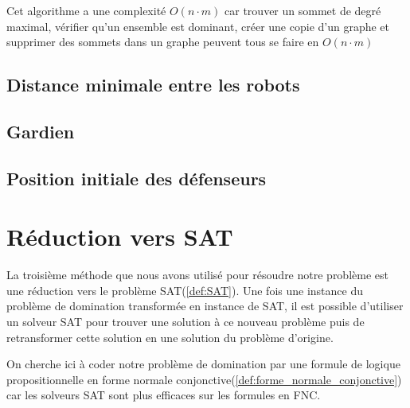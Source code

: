 \vspace{2\baselineskip}

Cet algorithme a une complexité $O(n\cdot m)$ car trouver un sommet de degré maximal, vérifier qu'un ensemble est dominant, créer une copie d'un graphe et supprimer des sommets dans un graphe peuvent tous se faire en $O(n\cdot m)$

\subsection{Distance minimale entre les robots}

\subsection{Gardien}

\subsection{Position initiale des défenseurs}

\section{Réduction vers SAT}

La troisième méthode que nous avons utilisé pour résoudre notre problème est une réduction vers le problème SAT(\ref{def:SAT}). Une fois une instance du problème de domination transformée en instance de SAT, il est possible d'utiliser un solveur SAT pour trouver une solution à ce nouveau problème puis de retransformer cette solution en une solution du problème d'origine.\newline 

On cherche ici à coder notre problème de domination par une formule de logique propositionnelle en forme normale conjonctive(\ref{def:forme_normale_conjonctive}) car les solveurs SAT sont plus efficaces sur les formules en FNC.

\vspace{2\baselineskip}

